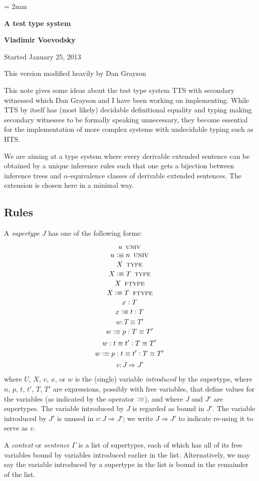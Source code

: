 \documentclass[11pt]{article}
\newcommand{\eqd}{\equiv}
\newcommand{\ccolon}{\vcentcolon}
\newcommand{\UNIV}{\mathop{\text{ \sc univ}}}
\newcommand{\TYPE}{\mathop{\text{ \sc type}}}
\newcommand{\FTYPE}{\mathop{\text{ \sc ftype}}}
\newcommand{\defn}{\vcentcolon\equiv}
\begin{document}
\parskip = 2mm
\begin{center}
{\bf\Large A test type system}

{\bf Vladimir Voevodsky}

{Started January 25, 2013}  

{This version modified heavily by Dan Grayson}  
\end{center}

\tableofcontents

This note gives some ideas about the test type system TTS with secondary
witnessed which Dan Grayson and I have been working on implementing. While TTS
by itself has (most likely) decidable definitional equality and typing making
secondary witnesses to be formally speaking unnecessary, they become essential
for the implementation of more complex systems with undecidable typing such as
HTS.

We are aiming at a type system where every derivable extended sentence can be
obtained by a unique inference rules such that one gets a bijection between
inference trees and $\alpha$-equivalence classes of derivable extended
sentences.  The extension is chosen here in a minimal way.

\subsection{Rules}

A {\em supertype} $J$ has one of the following forms:

$$ u \UNIV $$
$$ u \defn n \UNIV $$
$$ X \TYPE $$
$$ X \defn T \TYPE $$
$$ X \FTYPE $$
$$ X \defn T \FTYPE $$
$$ x \ccolon T $$
$$ x \defn t \ccolon T $$
$$ w : T \eqd T' $$
$$ w \defn p : T \eqd T' $$
$$ w : t \eqd t' \ccolon T \eqd T' $$
$$ w \defn p : t \eqd t' \ccolon T \eqd T' $$
$$ v : J \Rightarrow J' $$

where $U$, $X$, $v$, $x$, or $w$ is the (single) variable {\em introduced} by
the supertype, where $n$, $p$, $t$, $t'$, $T$, $T'$ are expressions, possibly
with free variables, that define values for the variables (as indicated by the
operator $\defn$), and where $J$ and $J'$ are supertypes.  The variable
introduced by $J$ is regarded as bound in $J'$.  The variable introduced by
$J'$ is unused in $ v : J \Rightarrow J' $; we write $ J \Rightarrow J' $ to
indicate re-using it to serve as $v$.

A {\em context} or {\em sentence} $\Gamma$ is a list of supertypes, each of
which has all of its free variables bound by variables introduced earlier in
the list.  Alternatively, we may say the variable introduced by a supertype in
the list is bound in the remainder of the list.
\end{document}
